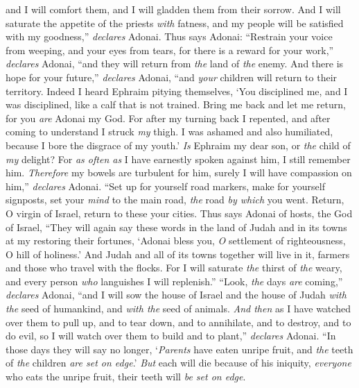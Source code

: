 \begin{biblechapter}
and I will comfort them, 
and I will gladden them from their sorrow.
\verse And I will saturate the appetite of the priests \textit{with} fatness, 
and my people will be satisfied with my goodness,” \textit{declares} Adonai.
\verse Thus says Adonai:
\verse “Restrain your voice from weeping, 
and your eyes from tears, 
for there is a reward for your work,” \textit{declares} Adonai, 
“and they will return from \textit{the} land of \textit{the} enemy.
\verse And there is hope for your future,” \textit{declares} Adonai, 
“and \textit{your} children will return to their territory.
\verse Indeed I heard Ephraim pitying themselves, 
‘You disciplined me, and I was disciplined, 
like a calf that is not trained. 
Bring me back and let me return, 
for you \textit{are} Adonai my God.
\verse For after my turning back I repented, 
and after coming to understand I struck \textit{my} thigh. 
I was ashamed and also humiliated, 
because I bore the disgrace of my youth.’
\verse \textit{Is} Ephraim my dear son, 
or \textit{the} child of \textit{my} delight? 
For \textit{as often as} I have earnestly spoken against him, 
I still remember him. 
\textit{Therefore} my bowels are turbulent for him, 
surely I will have compassion on him,” \textit{declares} Adonai.
\verse “Set up for yourself road markers, 
make for yourself signposts, 
set your \textit{mind} to the main road, 
\textit{the} road \textit{by which} you went. 
Return, O virgin of Israel, 
return to these your cities.
\verse Thus says Adonai of hosts, the God of Israel, “They will again say these words in the land of Judah and in its towns at my restoring their fortunes,
\verse ‘Adonai bless you, \textit{O} settlement of righteousness, 
O hill of holiness.’
\verse And Judah and all of its towns together will live in it, 
farmers and those who travel with the flocks.
\verse For I will saturate \textit{the} thirst of \textit{the} weary, 
and every person \textit{who} languishes I will replenish.”
 “Look, \textit{the} days \textit{are} coming,” \textit{declares} Adonai, “and I will sow the house of Israel and the house of Judah \textit{with the} seed of humankind, and \textit{with the} seed of animals.
\verse \textit{And then} as I have watched over them to pull up, and to tear down, and to annihilate, and to destroy, and to do evil, so I will watch over them to build and to plant,” \textit{declares} Adonai.
\verse “In those days they will say no longer, ‘\textit{Parents} have eaten unripe fruit, and \textit{the} teeth of \textit{the} children \textit{are set on edge}.’
\verse \textit{But} each will die because of his iniquity, \textit{everyone} who eats the unripe fruit, their teeth will \textit{be set on edge}.

\end{biblechapter}
